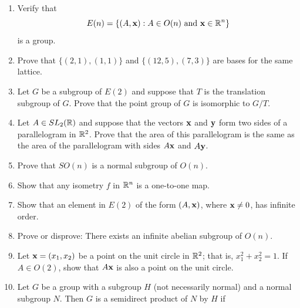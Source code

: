 {\begin{enumerate}
\begin{enumerate}
 \bf\item\rm
If $\langle {\bold x}, {\bold y} \rangle = 0$  for all ${\bold x}$ in
${\Bbb R}^n$, then ${\bold y} = 0$. 
 
\end{enumerate}
 
 
\bf\item\rm
Verify that
\[
E(n)
=
\{(A, {\bold x}) : A \in O(n) \mbox{ and } {\bold x} \in
{\Bbb R}^n \}
\]
is a group.
 
 
\bf\item\rm
Prove that $\{ (2,1), (1,1) \}$  and $\{ ( 12, 5), ( 7, 3) \}$ are bases
for the same lattice. 
 
 
\bf\item\rm
Let $G$ be a subgroup of $E(2)$ and suppose that $T$ is the
translation subgroup of $G$.  Prove that the point group of $G$ is
isomorphic to $G/T$. 
 
 
\bf\item\rm
Let $A \in SL_2({\Bbb R})$ and suppose that the vectors ${\bold x}$
and ${\bold y}$ form two sides of a parallelogram in ${\Bbb R}^2$.
Prove that the area of this parallelogram is the same as the area of
the parallelogram with sides $A{\bold x}$ and $A{\bold y}$. 
 
 
\bf\item\rm
Prove that $SO(n)$ is a normal subgroup of $O(n)$.
 
 
\bf\item\rm
Show that any isometry $f$ in ${\Bbb R}^n$ is a one-to-one map.
 
 
\bf\item\rm
Show that an element in $E(2)$ of the form $(A, {\bold x})$,
where ${\bold x} \neq 0$, has infinite order.
 
 
\bf\item\rm
Prove or disprove: There exists an infinite abelian subgroup of 
$O(n)$.
 
 
\bf\item\rm
Let ${\bold x} = (x_1, x_2)$ be a point on the unit circle in ${\Bbb
R}^2$; that is, $x_1^2 + x_2^2 = 1$. If $A \in O(2)$, show that $A
{\bold x}$ is also a point on the unit circle. 
 
 
 
\bf\item\rm
Let $G$ be a group with a subgroup $H$ (not necessarily normal) and a
normal subgroup $N$. Then $G$ is a {\bfi semidirect
product\/} of $N$ by $H$ if  
\begin{itemize}
 

\end{itemize}
\end{enumerate}}
